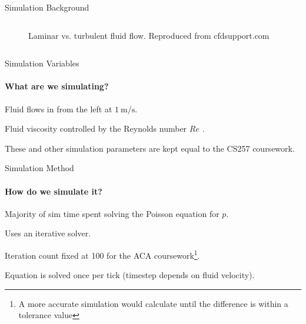 \begin{frame}{Simulation Background}
\begin{columns}[t, onlytextwidth]
\begin{column}{0.3\textwidth}
\begin{figure}
                \caption{Laminar vs. turbulent fluid flow. Reproduced from cfdsupport.com}
                \label{fig:laminar_flow}
            \end{figure}
        \end{column}
    \end{columns}
\end{frame}

\begin{frame}{Simulation Variables}
    \framesubtitle{What are we simulating?}
    \begin{wideitemize}
        \item Fluid flows in from the left at $\SI{1}{\metre\per\second}$.
        \item Fluid viscosity controlled by the Reynolds number $Re$  \parencite{falkovich2018fluid}.
        \item These and other simulation parameters are kept equal to the CS257 coursework. 
    \end{wideitemize}
    
\end{frame}

\begin{frame}{Simulation Method}
    \framesubtitle{How do we simulate it?}
    
    \begin{wideitemize}
        \item Majority of sim time spent solving the Poisson equation for $p$.
        \item Uses an iterative solver.
        \item Iteration count fixed at 100 for the ACA coursework\footnote{A more accurate simulation would calculate until the difference is within a tolerance value}.
        \item Equation is solved once per tick (timestep depends on fluid velocity).
    \end{wideitemize}
    
\end{frame}

